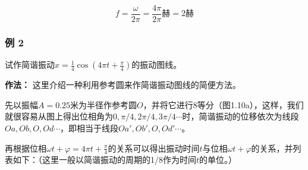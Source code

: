 \[
f = \frac {\omega}{2 \pi} = \frac {4 \pi}{2 \pi} \text{赫} = 2 \text{赫}
\]

\subsubsection{例 2}\label{ux4f8b-2}

试作简谐振动\(x = \frac{1}{4}\cos \left(4\pi t + \frac{\pi}{4}\right)\)的振动图线。

\textbf{作法：} 这里介绍一种利用参考圆来作简谐振动图线的简便方法。

先以振幅\(A = 0.25\)米为半径作参考圆\(O\)，并将它进行8等分（图1.10a），这样，我们就很容易从图上得出位相角为\(0, \pi / 4, 2\pi / 4, 3\pi / 4 \cdots\)时，简谐振动的位移依次为线段\(Oa, Ob, O, Od \cdots\)，即相当于线段\(Oa', Ob', O, Od' \cdots\)。

再根据位相\(\omega t + \varphi = 4\pi t + \frac{\pi}{4}\)的关系可以得出振动时间\(t\)与位相\(\omega t + \varphi\)的关系，并列表如下：（这里一般以简谐振动的周期的1/8作为时间\(t\)的单位。）

